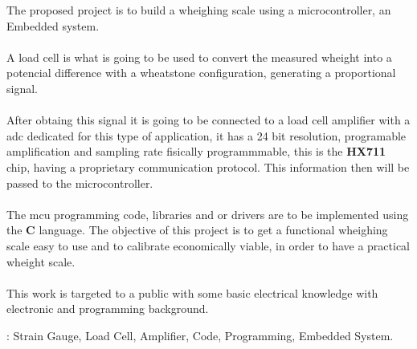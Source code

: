 \begin{secondlangabstract}

\par The proposed project is to build a wheighing scale using a microcontroller, an Embedded system.
\\
\\
A load cell is what is going to be used to convert the measured wheight into a potencial difference with a wheatstone configuration, generating a proportional signal.
\\
\\
After obtaing this signal it is going to be connected to a load cell amplifier with a \ac{adc} dedicated for this type of application, it has a 24 bit resolution, programable amplification and sampling rate fisically programmmable, this is the \textbf{HX711} chip, having a proprietary communication protocol.
This information then will be passed to the microcontroller.
\\
\\
The \ac{mcu} programming code, libraries and or drivers are to be implemented using the \textbf{C} language. The objective of this project is to get a functional wheighing scale easy to use and to calibrate economically viable, in order to have a practical wheight scale.
\\
\\
This work is targeted to a public with some basic electrical knowledge with electronic and programming background.



\vspace*{10mm} 
\noindent
\textbf{\keywordslabel}: Strain Gauge, Load Cell, Amplifier, Code, Programming, Embedded System.

\end{secondlangabstract}

